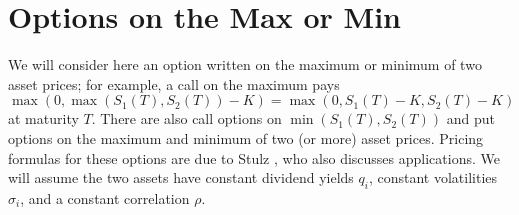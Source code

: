 


\section{Options on the Max or Min}

We will consider here an option written on the maximum or minimum of two asset prices; for example, a call on the maximum pays
$$\max(0,\max(S_1(T), S_2(T))-K) = \max(0,S_1(T)-K,S_2(T)-K)$$
at maturity $T$.  There are also call options on $\min(S_1(T), S_2(T))$ and put options on the maximum and minimum of two (or more) asset prices.  Pricing formulas for these options are due to Stulz \cite{Stulz}, who also discusses applications.  We will assume the two assets have constant dividend yields $q_i$, constant volatilities $\sigma_i$, and a constant correlation $\rho$.

\vfil\eject
